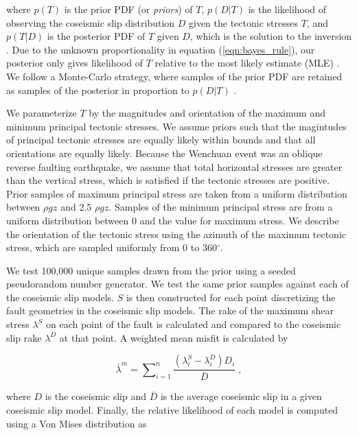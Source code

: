 \documentclass[twocolumn,jgrga]{AGUTeX}
\begin{document}
\begin{article}
where $p(T)$ is the prior PDF (or \emph{priors}) of $T$, $p(D|T)$ is the
likelihood of observing the coseismic slip distribution $D$ given the
tectonic stresses $T$, and $p(T|D)$ is the posterior PDF of $T$ given
$D$, which is the solution to the inversion \citep[e.g.,][]{mosegaard1995}.
Due to the unknown proportionality in equation (\ref{eqn:bayes_rule}),
our posterior only gives likelihood of $T$ relative to the most likely
estimate (MLE) \citep{tarantola2005}. We follow a Monte-Carlo strategy,
where samples of the prior PDF are retained as samples of the posterior
in proportion to $p(D|T)$ \citep[e.g.,][]{mosegaard1995}.

We parameterize $T$ by the magnitudes and orientation of the maximum and
minimum principal tectonic stresses. We assume priors such that the
magintudes of principal tectonic stresses are equally likely within
bounds and that all orientations are equally likely. Because the
Wenchuan event was an oblique reverse faulting earthquake, we assume
that total horizontal stresses are greater than the vertical stress,
which is satisfied if the tectonic stresses are positive. Prior samples
of maximum principal stress are taken from a uniform distribution
between $\rho g z$ and 2.5 $\rho g z$. Samples of the minimum principal
stress are from a uniform distribution between 0 and the value for
maximum stress. We describe the orientation of the tectonic stress using
the azimuth of the maximum tectonic stress, which are sampled uniformly
from 0 to 360$^{\circ}$.

We test 100,000 unique samples drawn from the prior using a seeded
pseudorandom number generator. We test the same prior samples against
each of the coseismic slip models. $S$ is then constructed for each
point discretizing the fault geometries in the coseismic slip models.
The rake of the maximum shear stress $\lambda^S$ on each point of the
fault is calculated and compared to the coseismic slip rake $\lambda^D$
at that point. A weighted mean misfit is calculated by

\begin{equation}
\bar{\lambda}^m = \sum \nolimits_{i=1}^n \frac{(\lambda^S_i - \lambda^D_i) D_i} 
{\bar{ D}} \; ,
\label{eqn:rake_misfit}
\end{equation}

where $D$ is the coseismic slip and $\bar{D}$ is the average coseismic
slip in a given coseismic slip model. Finally, the relative likelihood
of each model is computed using a Von Mises distribution as


\end{article}
\end{document}
